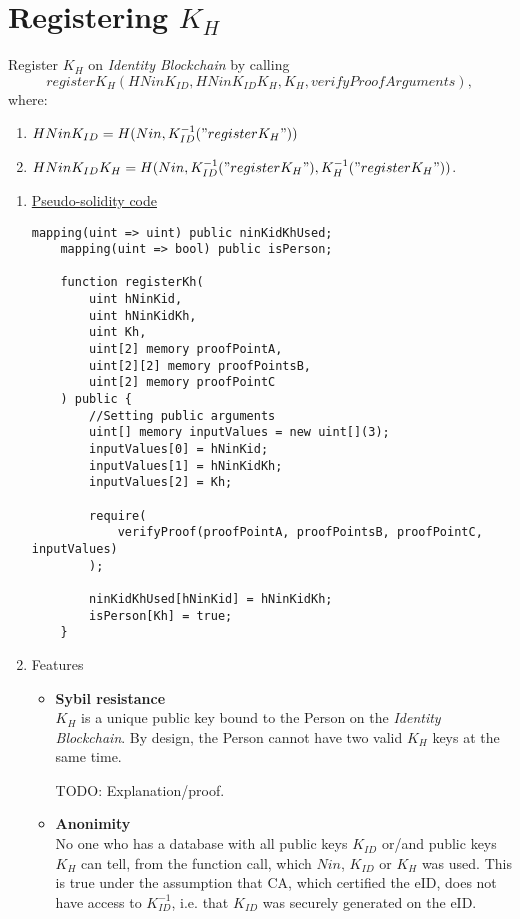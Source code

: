 \documentclass{article}
\newcommand{\khk}{K_{H}}
\newcommand{\kid}{K_{ID}}
\newcommand{\pbc}{\textit{Identity Blockchain}}
\begin{document}
\section{Registering $\khk$}
Register $\khk$ on \pbc{} by calling $$register\khk(HNin\kid, HNin\kid\khk, \khk, verifyProofArguments),$$
  where:
    \begin{enumerate}
      \item[] $HNin\kid=H(Nin,\kid^{-1}("register\khk"))$
      \item[] $HNin\kid\khk=H(Nin, \kid^{-1}("register\khk"), \khk^{-1}("register\khk"))$.
    \end{enumerate}
\begin{enumerate}[leftmargin=0cm]
	\item[] \underline{Pseudo-solidity code}

	\hfill\begin{minipage}{\dimexpr\textwidth-20px}
	\begin{lstlisting}[language=Solidity]
	mapping(uint => uint) public ninKidKhUsed;
	mapping(uint => bool) public isPerson;
	
	function registerKh(
		uint hNinKid,
		uint hNinKidKh,
		uint Kh,
		uint[2] memory proofPointA,
		uint[2][2] memory proofPointsB,
		uint[2] memory proofPointC
	) public {
		//Setting public arguments
		uint[] memory inputValues = new uint[](3);
		inputValues[0] = hNinKid;
		inputValues[1] = hNinKidKh;
		inputValues[2] = Kh;
	
		require(
			verifyProof(proofPointA, proofPointsB, proofPointC, inputValues)
		);
	
		ninKidKhUsed[hNinKid] = hNinKidKh;
		isPerson[Kh] = true;
	}
	\end{lstlisting}
	\xdef\tpd{\the\prevdepth}
	\end{minipage}

	\item[] Features
	\begin{itemize}
		  \item[] \textbf{Sybil resistance} \\ $\khk$ is a unique public key bound to the Person on the \pbc{}. By design, the Person cannot have two valid $\khk$ keys at the same time.
	
		  TODO: Explanation/proof.
		  \vspace{5px}
		\item[] \textbf{Anonimity} \\ No one who has a database with all public keys $\kid$ or/and public keys $\khk$ can tell, from the function call, which $Nin$, $\kid$ or $\khk$ was used. This is true under the assumption that CA, which certified the eID, does not have access to $\kid^{-1}$, i.e. that $\kid$ was securely generated on the eID.
	

\end{itemize}
\end{enumerate}
\end{document}

